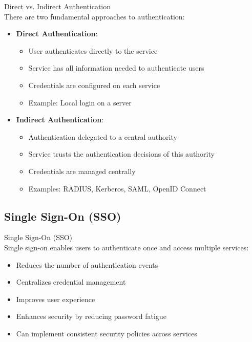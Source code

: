 \begin{concept}{Direct vs. Indirect Authentication}\\
There are two fundamental approaches to authentication:
\begin{itemize}
    \item \textbf{Direct Authentication}:
    \begin{itemize}
        \item User authenticates directly to the service
        \item Service has all information needed to authenticate users
        \item Credentials are configured on each service
        \item Example: Local login on a server
    \end{itemize}
    \item \textbf{Indirect Authentication}:
    \begin{itemize}
        \item Authentication delegated to a central authority
        \item Service trusts the authentication decisions of this authority
        \item Credentials are managed centrally
        \item Examples: RADIUS, Kerberos, SAML, OpenID Connect
    \end{itemize}
\end{itemize}
\end{concept}

\subsection{Single Sign-On (SSO)}

\begin{definition}{Single Sign-On (SSO)}\\
Single sign-on enables users to authenticate once and access multiple services:
\begin{itemize}
    \item Reduces the number of authentication events
    \item Centralizes credential management
    \item Improves user experience
    \item Enhances security by reducing password fatigue
    \item Can implement consistent security policies across services
\end{itemize}
\end{definition}

